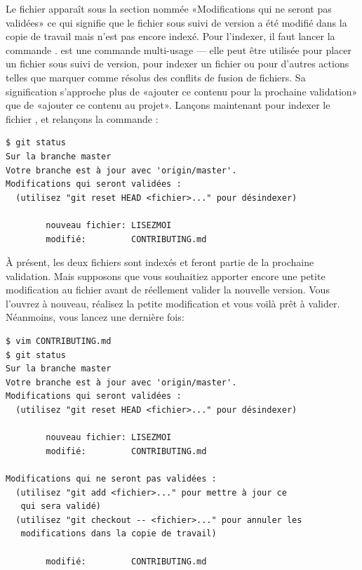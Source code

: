 Le fichier  apparaît sous la section nommée «Modifications qui ne seront pas validées» ce qui signifie que le fichier sous suivi de version a été modifié dans la copie de travail mais n'est pas encore indexé.
Pour l'indexer, il faut lancer la commande .  est une commande multi-usage --- elle peut être utilisée pour placer un fichier sous suivi de version, pour indexer un fichier ou pour d'autres actions telles que marquer comme résolus des conflits de fusion de fichiers.
Sa signification s'approche plus de «ajouter ce contenu pour la prochaine validation» que de «ajouter ce contenu au projet».
Lançons maintenant  pour indexer le fichier , et relançons la commande :
\begin{Schunk}
\begin{Verbatim}
$ git status
Sur la branche master
Votre branche est à jour avec 'origin/master'.
Modifications qui seront validées :
  (utilisez "git reset HEAD <fichier>..." pour désindexer)

        nouveau fichier: LISEZMOI
        modifié:         CONTRIBUTING.md

\end{Verbatim}
\end{Schunk}

À présent, les deux fichiers sont indexés et feront partie de la prochaine validation.
Mais supposons que vous souhaitiez apporter encore une petite modification au fichier  avant de réellement valider la nouvelle version.
Vous l'ouvrez à nouveau, réalisez la petite modification et vous voilà prêt à valider.
Néanmoins, vous lancez  une dernière fois:
\begin{Schunk}
\begin{Verbatim}
$ vim CONTRIBUTING.md
$ git status
Sur la branche master
Votre branche est à jour avec 'origin/master'.
Modifications qui seront validées :
  (utilisez "git reset HEAD <fichier>..." pour désindexer)

        nouveau fichier: LISEZMOI
        modifié:         CONTRIBUTING.md

Modifications qui ne seront pas validées :
  (utilisez "git add <fichier>..." pour mettre à jour ce
   qui sera validé)
  (utilisez "git checkout -- <fichier>..." pour annuler les
   modifications dans la copie de travail)

        modifié:         CONTRIBUTING.md
\end{Verbatim}
\end{Schunk}


